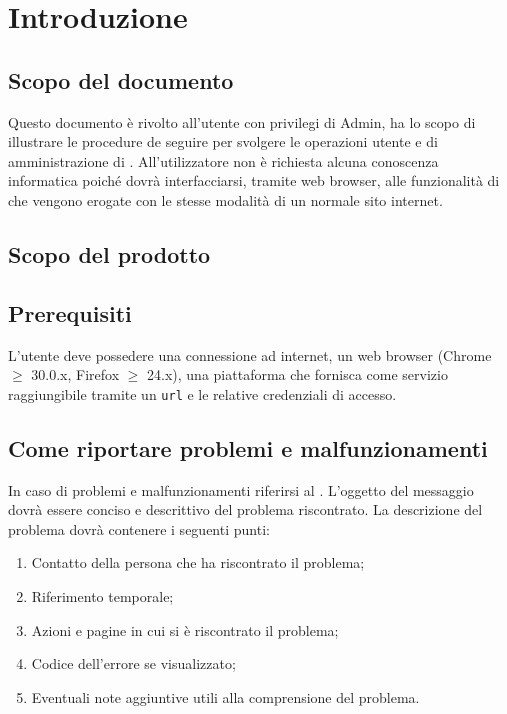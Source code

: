 \section{Introduzione}


	\subsection{Scopo del documento}
	Questo documento è rivolto all'utente con privilegi di Admin, ha lo scopo di illustrare le procedure de seguire per svolgere le operazioni utente e di amministrazione di . All'utilizzatore non è richiesta alcuna conoscenza informatica poiché dovrà interfacciarsi, tramite web browser, alle funzionalità di  che vengono erogate con le stesse modalità di un normale sito internet.

	\subsection{Scopo del prodotto}
	\ScopoDelProdotto{}

	\subsection{Prerequisiti}
	L'utente deve possedere una connessione ad internet, un web browser (Chrome $\geq$ 30.0.x, Firefox $\geq$ 24.x), una piattaforma che fornisca  come servizio raggiungibile tramite un \texttt{url} e le relative credenziali di accesso.


	\subsection{Come riportare problemi e malfunzionamenti}
	In caso di problemi e malfunzionamenti riferirsi al . L'oggetto del messaggio dovrà essere conciso e descrittivo del problema riscontrato. La descrizione del problema dovrà contenere i seguenti punti:

	\begin{enumerate}
		\item Contatto della persona che ha riscontrato il problema;
		\item Riferimento temporale;
		\item Azioni e pagine in cui si è riscontrato il problema;
		\item Codice dell'errore se visualizzato;
		\item Eventuali note aggiuntive utili alla comprensione del problema.
	\end{enumerate}

